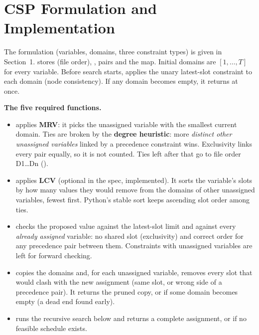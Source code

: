 \newpage
\section{CSP Formulation and Implementation}

The formulation (variables, domains, three constraint types) is given in Section~1.
 stores  (file order), ,  pairs
and the  map. Initial domains are $[1,\dots,T]$ for every variable. Before search
starts,  applies the unary latest-slot constraint to each domain (node
consistency). If any domain becomes empty, it returns  at once.

\textbf{The five required functions.}
\begin{itemize}
  \item {} applies \textbf{MRV}: it picks the unassigned variable
    with the smallest current domain. Ties are broken by the \textbf{degree heuristic}: more
    \emph{distinct other unassigned variables} linked by a precedence constraint wins. Exclusivity
    links every pair equally, so it is not counted. Ties left after that go to file order
    D1\dots Dn ().
  \item {} applies \textbf{LCV} (optional in the spec, implemented). It
    sorts the variable's slots by how many values they would remove from the domains of other
    unassigned variables, fewest first. Python's stable sort keeps ascending slot order among ties.
  \item {} checks the proposed value against the latest-slot limit and against
    every \emph{already assigned} variable: no shared slot (exclusivity) and correct order for any
    precedence pair between them. Constraints with unassigned variables are left for forward
    checking.
  \item {} copies the domains and, for each unassigned variable, removes every
    slot that would clash with the new assignment (same slot, or wrong side of a precedence pair).
    It returns the pruned copy, or  if some domain becomes empty (a dead end found early).
  \item {} runs the recursive search below and returns a complete
    assignment, or  if no feasible schedule exists.
\end{itemize}

